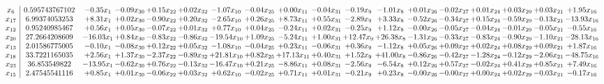 \documentclass[9pt]{article}
\begin{document}
\[\begin{array}{c| c c@{\hskip 2pt} c@{\hskip 2pt} c@{\hskip 2pt} c@{\hskip 2pt} c@{\hskip 2pt} c@{\hskip 2pt} c@{\hskip 2pt} c@{\hskip 2pt} c@{\hskip 2pt} c@{\hskip 2pt} c@{\hskip 2pt} c@{\hskip 2pt} c@{\hskip 2pt} c@{\hskip 2pt} c@{\hskip 2pt} c@{\hskip 2pt} }
 x_{6}   &  0.595743767102 & -0.35 x_{1} & -0.09 x_{30} & +  0.15 x_{22} & +  0.02 x_{32} & -1.07 x_{10} & -0.04 x_{25} & +  0.00 x_{11} & -0.04 x_{31} & -0.19 x_{9} & -1.01 x_{8} & +  0.01 x_{26} & -0.02 x_{27} & +  0.01 x_{24} & +  0.03 x_{29} & +  0.03 x_{21} & +  1.95 x_{16}\\
 x_{17}   &  6.99374053253 & +  8.31 x_{1} & +  0.02 x_{30} & -0.90 x_{22} & +  0.20 x_{32} & -2.65 x_{10} & +  0.26 x_{25} & +  8.73 x_{11} & +  0.55 x_{31} & -2.89 x_{9} & +  3.33 x_{8} & -0.52 x_{26} & -0.34 x_{27} & +  0.15 x_{24} & -0.59 x_{29} & -0.13 x_{21} & -13.93 x_{16}\\
 x_{12}   &  0.95240985467 & +  0.56 x_{1} & +  0.05 x_{30} & -0.07 x_{22} & +  0.01 x_{32} & +  0.77 x_{10} & +  0.04 x_{25} & -0.24 x_{11} & +  0.02 x_{31} & -0.25 x_{9} & +  1.12 x_{8} & -0.00 x_{26} & -0.05 x_{27} & -0.04 x_{24} & -0.01 x_{29} & -0.05 x_{21} & -0.55 x_{16}\\
 x_{20}   &  27.2664208609 & -16.03 x_{1} & +  0.84 x_{30} & -0.83 x_{22} & -0.86 x_{32} & -19.54 x_{10} & +  1.09 x_{25} & -5.24 x_{11} & +  1.00 x_{31} & + 12.47 x_{9} & + 26.38 x_{8} & -1.31 x_{26} & -0.33 x_{27} & -0.83 x_{24} & -0.90 x_{29} & -1.10 x_{21} & -28.13 x_{16}\\
 x_{13}   &  2.01586775005 & -0.10 x_{1} & -0.08 x_{30} & +  0.12 x_{22} & +  0.05 x_{32} & -1.08 x_{10} & -0.04 x_{25} & +  0.23 x_{11} & -0.06 x_{31} & +  0.36 x_{9} & -1.12 x_{8} & +  0.05 x_{26} & +  0.09 x_{27} & +  0.02 x_{24} & +  0.08 x_{29} & +  0.09 x_{21} & +  1.87 x_{16}\\
 x_{18}   &  33.7221165035 & +  2.56 x_{1} & +  1.37 x_{30} & -2.37 x_{22} & -0.89 x_{32} & + 21.81 x_{10} & +  0.82 x_{25} & + 17.13 x_{11} & +  0.40 x_{31} & +  1.52 x_{9} & + 41.00 x_{8} & -0.86 x_{26} & -0.42 x_{27} & -1.28 x_{24} & -0.12 x_{29} & -2.06 x_{21} & -48.75 x_{16}\\
 x_{23}   &  36.853549822 & -13.95 x_{1} & -0.62 x_{30} & +  0.76 x_{22} & -0.13 x_{32} & -16.47 x_{10} & +  0.21 x_{25} & -8.86 x_{11} & +  0.08 x_{31} & -2.56 x_{9} & -6.54 x_{8} & +  0.12 x_{26} & +  0.57 x_{27} & -0.02 x_{24} & +  0.41 x_{29} & +  0.85 x_{21} & +  7.49 x_{16}\\
 x_{15}   &  2.47545541116 & +  0.85 x_{1} & +  0.01 x_{30} & -0.06 x_{22} & +  0.03 x_{32} & +  0.62 x_{10} & -0.02 x_{25} & +  0.71 x_{11} & +  0.01 x_{31} & -0.21 x_{9} & +  0.23 x_{8} & -0.00 x_{26} & -0.00 x_{27} & +  0.00 x_{24} & +  0.02 x_{29} & -0.03 x_{21} & -0.17 x_{16}\\

\end{array}\]
\end{document}
